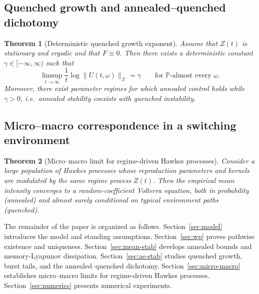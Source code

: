 \documentclass[12pt,a4paper]{article}
\theoremstyle{plain}
\newtheorem{theorem}{Theorem}[section]
\theoremstyle{definition}
\theoremstyle{remark}
\begin{document}
\subsection*{Quenched growth and annealed--quenched dichotomy}

\begin{theorem}[Deterministic quenched growth exponent]
	\label{thm:main-quenched}
	Assume that $Z(t)$ is stationary and ergodic and that $F\equiv 0$.
	Then there exists a deterministic constant $\gamma\in[-\infty,\infty)$ such that
	\[
	\limsup_{t\to\infty}\frac{1}{t}\log\|U(t,\omega)\|_{\mathcal X}
	=
	\gamma
	\qquad\text{for $\mathbb P$-almost every }\omega.
	\]
	Moreover, there exist parameter regimes for which annealed control holds while
	$\gamma>0$, i.e.\ annealed stability coexists with quenched instability.
\end{theorem}

\subsection*{Micro--macro correspondence in a switching environment}

\begin{theorem}[Micro--macro limit for regime-driven Hawkes processes]
	\label{thm:main-micro-macro}
	Consider a large population of Hawkes processes whose reproduction parameters
	and kernels are modulated by the same regime process $Z(t)$.
	Then the empirical mean intensity converges to a random-coefficient Volterra
	equation, both in probability (annealed) and almost surely conditional on typical
	environment paths (quenched).
\end{theorem}


The remainder of the paper is organized as follows.
Section~\ref{sec:model} introduces the model and standing assumptions.
Section~\ref{sec:wp} proves pathwise existence and uniqueness.
Section~\ref{sec:mean-stab} develops annealed bounds and memory-Lyapunov dissipation.
Section~\ref{sec:as-stab} studies quenched growth, burst tails, and the
annealed--quenched dichotomy.
Section~\ref{sec:micro-macro} establishes micro--macro limits for regime-driven Hawkes
processes.
Section~\ref{sec:numerics} presents numerical experiments.


\end{document}
